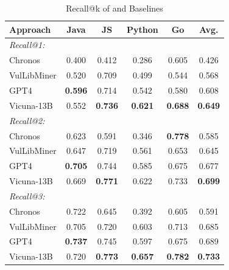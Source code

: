 \begin{table}[t]
\centering
\caption{Recall@k of \detector{} and Baselines}
\label{tab: baseline cmp: recall}
\small
\begin{threeparttable}
\begin{tabular}{lccccc}
\toprule
Approach     & Java    & JS     & Python & Go  & Avg.   \\
\midrule
\multicolumn{5}{l}{\textit{Recall@1:}}               \\
Chronos     & 0.400    & 0.412 & 0.286  & 0.605 & 0.426   \\
VulLibMiner & 0.520    & 0.709 & 0.499  & 0.544 & 0.568   \\
GPT4        & \textbf{0.596}    & 0.714 & 0.542  & 0.580 & 0.608   \\
Vicuna-13B  & 0.552    & \textbf{0.736} & \textbf{0.621}  & \textbf{0.688} & \textbf{0.649}   \\
\midrule
\multicolumn{5}{l}{\textit{Recall@2:}} &              \\
Chronos     & 0.623    & 0.591 & 0.346  & \textbf{0.778} & 0.585   \\
VulLibMiner & 0.647    & 0.719 & 0.561  & 0.653 & 0.645   \\
GPT4        & \textbf{0.705}    & 0.744 & 0.585  & 0.675 & 0.677   \\
Vicuna-13B  & 0.669    & \textbf{0.771} & 0.622  & 0.733 & \textbf{0.699}   \\
\midrule
\multicolumn{5}{l}{\textit{Recall@3:}} &   \\
Chronos     & 0.722    & 0.645 & 0.392  & 0.605 & 0.591   \\
VulLibMiner & 0.705    & 0.720 & 0.603  & 0.713 & 0.685   \\
GPT4        & \textbf{0.737}    & 0.745 & 0.597  & 0.675 & 0.689   \\
Vicuna-13B  & 0.720    & \textbf{0.773} & \textbf{0.657}  & \textbf{0.782} & \textbf{0.733}   \\
\bottomrule
\end{tabular}
\end{threeparttable}
\end{table}

